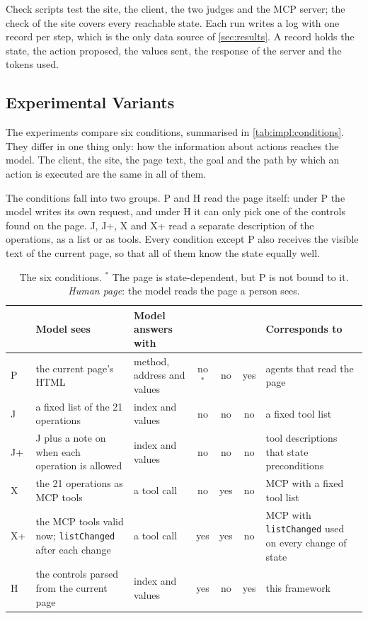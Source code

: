 Check scripts test the site, the client, the two judges and the MCP server; the check of the site covers every reachable state.
Each run writes a log with one record per step, which is the only data source of \autoref{sec:results}.
A record holds the state, the action proposed, the values sent, the response of the server and the tokens used.

\FloatBarrier

\subsection{Experimental Variants}\label{sec:eval:method:conditions}

The experiments compare six conditions, summarised in \autoref{tab:impl:conditions}.
They differ in one thing only: how the information about actions reaches the model.
The client, the site, the page text, the goal and the path by which an action is executed are the same in all of them.

The conditions fall into two groups.
P and H read the page itself: under P the model writes its own request, and under H it can only pick one of the controls found on the page.
J, J+, X and X+ read a separate description of the operations, as a list or as tools.
Every condition except P also receives the visible text of the current page, so that all of them know the state equally well.

\begin{table}[htbp]
\centering
\caption{The six conditions. $^{*}$ The page is state-dependent, but P is not bound to it. \emph{Human page}: the model reads the page a person sees.}
\label{tab:impl:conditions}
\renewcommand{\arraystretch}{1.3}
\small
\begin{tabularx}{\textwidth}{lLLcccL}
\hline
 & Model sees & Model answers with &  &  &  & Corresponds to \\
\hline
P & the current page's HTML & method, address and values & no$^{*}$ & no & yes & agents that read the page \\
\hline
J & a fixed list of the 21 operations & index and values & no & no & no & a fixed tool list \\
\hline
J+ & J plus a note on when each operation is allowed & index and values & no & no & no & tool descriptions that state preconditions \\
\hline
X & the 21 operations as MCP tools & a tool call & no & yes & no & MCP with a fixed tool list \\
\hline
X+ & the MCP tools valid now; \texttt{listChanged} after each change & a tool call & yes & yes & no & MCP with \texttt{listChanged} used on every change of state \\
\hline
H & the controls parsed from the current page & index and values & yes & no & yes & this framework \\
\hline
\end{tabularx}
\end{table}


